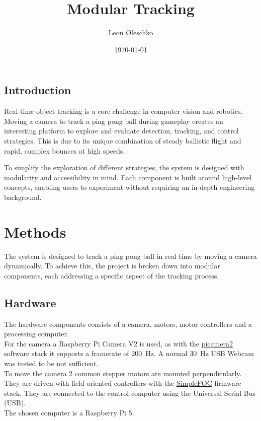 \documentclass[
    parskip=half, 
    twoside=false,
    twocolumn=true,
    fontsize=12pt,
]{scrarticle}
\begin{document}
\title{Modular Tracking}
\author{Leon Oleschko}
\date{\dotdate\today}

\subsection*{Introduction}
Real-time object tracking is a core challenge in computer vision and robotics. Moving a camera to track a ping pong ball during gameplay creates an interesting platform to explore and evaluate detection, tracking, and control strategies. This is due to its unique combination of steady ballistic flight and rapid, complex bounces at high speeds.

To simplify the exploration of different strategies, the system is designed with modularity and accessibility in mind. Each component is built around high-level concepts, enabling users to experiment without requiring an in-depth engineering background.


\section{Methods}
The system is designed to track a ping pong ball in real time by moving a camera dynamically. To achieve this, the project is broken down into modular components, each addressing a specific aspect of the tracking process. 

\subsection*{Hardware}
The hardware components consists of a camera, motors, motor controllers and a processing computer.\\
For the camera a Raspberry Pi Camera V2 is used, as with the \href{https://github.com/raspberrypi/picamera2}{picamera2} software stack it supports a framerate of \SI{200}{Hz}.
A normal \SI{30}{Hz} USB Webcam was tested to be not sufficient.\\
To move the camera 2 common stepper motors are mounted perpendicularly.
They are driven with field oriented controllers with the \href{https://simplefoc.com/}{SimpleFOC} firmware stack.
They are connected to the control computer using the Universal Serial Bus (USB).\\
The chosen computer is a Raspberry Pi 5.
\end{document}
